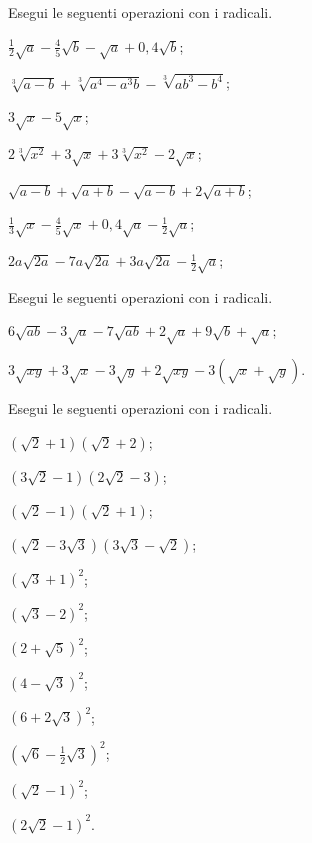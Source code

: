 \begin{esercizio}[\Ast]
 \label{ese:2.53}
Esegui le seguenti operazioni con i radicali.
 \begin{multicols}{2}
 \begin{enumeratea}
 \item $\frac 1 2\sqrt a-\frac 4 5\sqrt b-\sqrt a+0,4\sqrt b$;
 \item $\sqrt[3]{a-b}+\sqrt[3]{a^4-a^3b}-\sqrt[3]{{ab}^3-b^4}$;
 \item $3\sqrt x-5\sqrt x$;
 \item $2\sqrt[3]{x^2}+3\sqrt x+3\sqrt[3]{x^2}-2\sqrt x$;
 \item $\sqrt{a-b}+\sqrt{a+b}-\sqrt{a-b}+2\sqrt{a+b}$;
 \item $\frac 1 3\sqrt x-\frac 4 5\sqrt x+0,4\sqrt a-\frac 1 2\sqrt a$;
 \item $2a\sqrt{2a}-7a\sqrt{2a}+3a\sqrt{2a}-\frac 1 2\sqrt a$;
 \end{enumeratea}
 \end{multicols}
\end{esercizio}

\begin{esercizio}[\Ast]
 \label{ese:2.54}
Esegui le seguenti operazioni con i radicali.
 \begin{enumeratea}
 \item $6\sqrt{{ab}}-3\sqrt a-7\sqrt{{ab}}+2\sqrt a+9\sqrt b+\sqrt a$;
 \item $3\sqrt{xy}+3\sqrt x-3\sqrt y+2\sqrt{xy}-3(\sqrt x+\sqrt y)$.
 \end{enumeratea}
\end{esercizio}

\begin{esercizio}[\Ast]
 \label{ese:2.55}
Esegui le seguenti operazioni con i radicali.
 \begin{multicols}{3}
 \begin{enumeratea}
 \item $(\sqrt 2+1)(\sqrt 2+2)$;
 \item $(3\sqrt 2-1)(2\sqrt 2-3)$;
 \item $(\sqrt 2-1)(\sqrt 2+1)$;
 \item $(\sqrt 2-3\sqrt 3)(3\sqrt 3-\sqrt 2)$;
 \item $(\sqrt 3+1)^2$;
 \item $(\sqrt 3-2)^2$;
 \item $(2+\sqrt 5)^2$;
 \item $(4-\sqrt 3)^2$;
 \item $(6+2\sqrt 3)^2$;
 \item $(\sqrt 6-\frac 1 2\sqrt 3)^2$;
 \item $(\sqrt 2-1)^2$;
 \item $(2\sqrt 2-1)^2$.
 \end{enumeratea}
 \end{multicols}
\end{esercizio}

